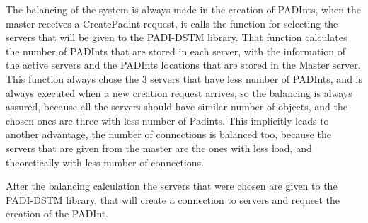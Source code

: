 \documentclass[times, 10pt,twocolumn]{article}
\begin{document}

The balancing of the system is always made in the creation of PADInts, when the master receives a CreatePadint request, it calls the function for selecting the servers that will be given to the PADI-DSTM library. That function calculates the number of PADInts that are stored in each server, with the information of the active servers and the PADInts locations that are stored in the Master server. This function always chose the 3 servers that have less number of PADInts, and is always executed when a new creation request arrives, so the balancing is always assured, because all the servers should have similar number of objects, and the chosen ones are three with less number of Padints. This implicitly leads to another advantage, the number of connections is balanced too, because the servers that are given from the master are the ones with less load, and theoretically with less number of connections.

After the balancing calculation the servers that were chosen are given to the PADI-DSTM library, that will create a connection to servers and request the creation of the PADInt.


\end{document}
